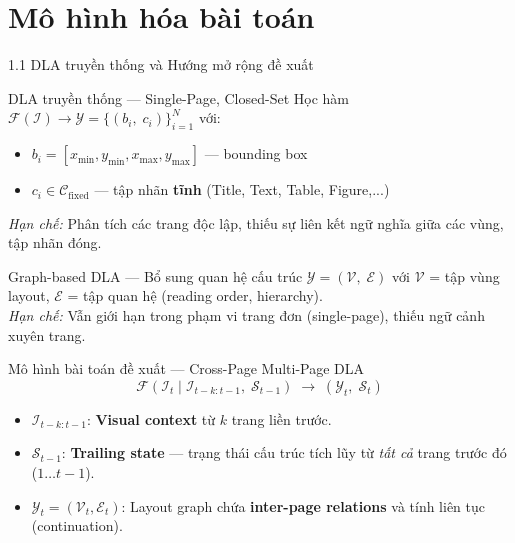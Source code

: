 \documentclass[aspectratio=1610,8pt]{beamer}
\begin{document}
\section{Mô hình hóa bài toán}

\begin{frame}{1.1 \; DLA truyền thống và Hướng mở rộng đề xuất}
    \begin{block}{DLA truyền thống \cite{zhong2019publaynet, dla_benchmark_2022_sigkdd_2022_doclaynet} — Single-Page, Closed-Set}
        Học hàm $\mathcal{F}(\mathcal{I}) \rightarrow \mathcal{Y} = \{(b_i,\; c_i)\}_{i=1}^{N}$ với:
        \begin{itemize}
            \item $b_i = [x_{\min}, y_{\min}, x_{\max}, y_{\max}]$ — bounding box
            \item $c_i \in \mathcal{C}_{\text{fixed}}$ — tập nhãn \textbf{tĩnh} (Title, Text, Table, Figure,...)
        \end{itemize}
        \textit{Hạn chế:} Phân tích các trang độc lập, thiếu sự liên kết ngữ nghĩa giữa các vùng, tập nhãn đóng.
    \end{block}

    \vspace{0.3em}
    \begin{block}{Graph-based DLA \cite{dla_2022_coling_2022_doc_gcn_heterogeneous_graph_convolutional_networks_for_document, dla_2023_icdar_2023_a_graphical_approach_to_document_layout_analysis_pdf} — Bổ sung quan hệ cấu trúc}
        $\mathcal{Y} = (\mathcal{V},\; \mathcal{E})$ \quad với $\mathcal{V}$ = tập vùng layout, $\mathcal{E}$ = tập quan hệ (reading order, hierarchy).\\
        \textit{Hạn chế:} Vẫn giới hạn trong phạm vi trang đơn (single-page), thiếu ngữ cảnh xuyên trang.
    \end{block}

    \vspace{0.3em}
    \begin{alertblock}{Mô hình bài toán đề xuất — Cross-Page Multi-Page DLA}
        $$\mathcal{F}\!\left(\mathcal{I}_t \;\big|\; \mathcal{I}_{t-k:t-1},\; \mathcal{S}_{t-1}\right) \;\longrightarrow\; \left(\mathcal{Y}_t,\; \mathcal{S}_t\right)$$
        \begin{itemize}
            \item $\mathcal{I}_{t-k:t-1}$: \textbf{Visual context} từ $k$ trang liền trước.
            \item $\mathcal{S}_{t-1}$: \textbf{Trailing state} — trạng thái cấu trúc tích lũy từ \textit{tất cả} trang trước đó ($1 \ldots t{-}1$).
            \item $\mathcal{Y}_t = (\mathcal{V}_t, \mathcal{E}_t)$: Layout graph chứa \textbf{inter-page relations} và tính liên tục (continuation).
        \end{itemize}
    \end{alertblock}
\end{frame}
\end{document}
